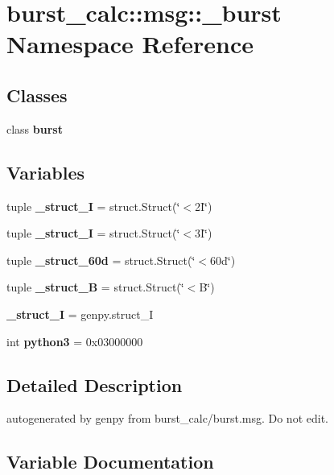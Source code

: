 \section{burst\-\_\-calc\-:\-:msg\-:\-:\-\_\-burst \-Namespace \-Reference}
\label{namespaceburst__calc_1_1msg_1_1__burst}
\subsection*{\-Classes}
\begin{DoxyCompactItemize}
\item 
class {\bf burst}
\end{DoxyCompactItemize}
\subsection*{\-Variables}
\begin{DoxyCompactItemize}
\item 
tuple {\bf \-\_\-struct\-\_\-I} = struct.\-Struct(\char`\"{}$<$2\-I\char`\"{})
\item 
tuple {\bf \-\_\-struct\-\_\-I} = struct.\-Struct(\char`\"{}$<$3\-I\char`\"{})
\item 
tuple {\bf \-\_\-struct\-\_\-60d} = struct.\-Struct(\char`\"{}$<$60d\char`\"{})
\item 
tuple {\bf \-\_\-struct\-\_\-\-B} = struct.\-Struct(\char`\"{}$<$\-B\char`\"{})
\item 
{\bf \-\_\-struct\-\_\-\-I} = genpy.\-struct\-\_\-\-I
\item 
int {\bf python3} = 0x03000000
\end{DoxyCompactItemize}


\subsection{\-Detailed \-Description}
\begin{DoxyVerb}autogenerated by genpy from burst_calc/burst.msg. Do not edit.\end{DoxyVerb}
 

\subsection{\-Variable \-Documentation}
